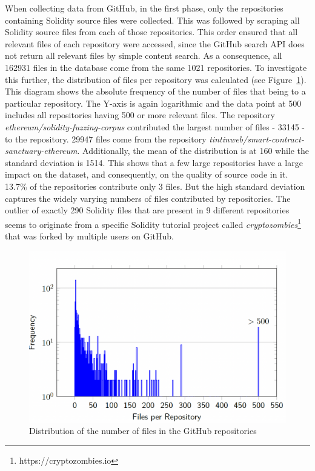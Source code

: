 \documentclass[10pt,conference]{IEEEtran}
\begin{document}
	When collecting data from GitHub, in the first phase, only the repositories containing Solidity source files were collected. This was followed by scraping all Solidity source files from each of those repositories. This order ensured that all relevant files of each repository were accessed, since the GitHub search API does not return all relevant files by simple content search. As a consequence, all 162931 files in the database come from the same 1021 repositories. To investigate this further, the distribution of files per repository was calculated (see Figure~\ref{fig:number}). This diagram shows the absolute frequency of the number of files that being to a particular repository. The Y-axis is again logarithmic and the data point at 500 includes all repositories having 500 or more relevant files. The repository \textit{ethereum/solidity-fuzzing-corpus} contributed the largest number of files - 33145 - to the repository. 29947 files come from the repository \textit{tintinweb/smart-contract-sanctuary-ethereum}. Additionally, the mean of the distribution is at 160 while the standard deviation is 1514. This shows that a few large repositories have a large impact on the dataset, and consequently, on the quality of source code in it. 13.7\% of the repositories contribute only 3 files. But the high standard deviation captures the widely varying numbers of files contributed by repositories. The outlier of exactly 290 Solidity files that are present in 9 different repositories seems to originate from a specific Solidity tutorial project called \textit{cryptozombies}\footnote{https://cryptozombies.io} that was forked by multiple users on GitHub.
	\begin{figure}[!h]
		\centering
		\includegraphics[scale=0.3]{distr_files_repos.png}
		\caption{Distribution of the number of files in the GitHub repositories}
		\label{fig:number}
	\end{figure}
	
\end{document}
